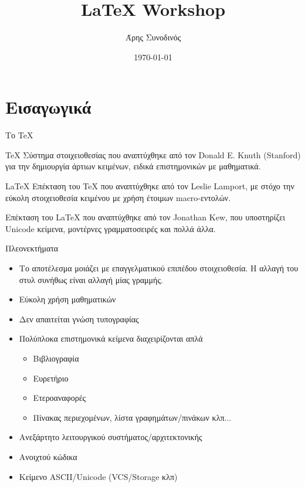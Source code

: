 \documentclass[xetex]{beamer}
\title{\LaTeX{} Workshop}
\author{Άρης Συνοδινός}
\institute{Πανεπιστήμιο Πατρών}
\date{\today}
\begin{document}
\begin{frame}[plain]
\titlepage
\end{frame}

\section{Εισαγωγικά}

\begin{frame}{Το \TeX{}}
	\begin{block}{\TeX{}}
		Σύστημα στοιχειοθεσίας που αναπτύχθηκε από τον Donald E. Knuth
		 (Stanford) για την δημιουργία άρτιων κειμένων, ειδικά επιστημονικών
		 με μαθηματικά. 
	\end{block}
	\begin{exampleblock}{\LaTeX{}}
		Επέκταση του \TeX{} που αναπτύχθηκε από τον Leslie Lamport, με
		στόχο την εύκολη στοιχειοθεσία κειμένου με χρήση έτοιμων macro-εντολών.
	\end{exampleblock}
	\begin{alertblock}{\XeTeX{}}
		Επέκταση του \LaTeX{} που αναπτύχθηκε από τον Jonathan Kew, που υποστηρίζει
		Unicode κείμενα, μοντέρνες γραμματοσειρές και πολλά άλλα.
	\end{alertblock}
\end{frame}

\begin{frame}{Πλεονεκτήματα}
	\begin{itemize}
		\item Το αποτέλεσμα μοιάζει με επαγγελματικού επιπέδου στοιχειοθεσία.
		Η αλλαγή του στυλ συνήθως είναι αλλαγή μίας γραμμής.
		\item Εύκολη χρήση μαθηματικών
		\item Δεν απαιτείται γνώση τυπογραφίας
		\item Πολύπλοκα επιστημονικά κείμενα διαχειρίζονται απλά
		\begin{itemize}
			\item Βιβλιογραφία
			\item Ευρετήριο
			\item Ετεροαναφορές
			\item Πίνακας περιεχομένων, λίστα γραφημάτων/πινάκων κλπ...
		\end{itemize}
		\item Ανεξάρτητο λειτουργικού συστήματος/αρχιτεκτονικής
		\item Ανοιχτού κώδικα
		\item Κείμενο ASCII/Unicode (VCS/Storage κλπ)
	\end{itemize}
\end{frame}
\end{document}
